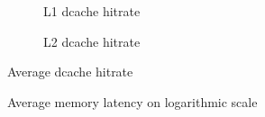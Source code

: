 \begin{figure}
    \centering
    \begin{subfigure}{\textwidth}
         \centering
         \caption{L1 dcache hitrate}
         \label{fig:l1_dcache_hitrate}
     \end{subfigure}
     \hfill
         \begin{subfigure}{\textwidth}
         \centering
         \caption{L2 dcache hitrate}
         \label{fig:l2_dcache_hitrate}
    \end{subfigure}
    \caption{Average dcache hitrate}
    \label{fig:dcache_hitrate}
\end{figure}

\begin{figure}
    \centering
    \caption{Average memory latency on logarithmic scale}
    \label{fig:avg_mem_latency}
\end{figure}

